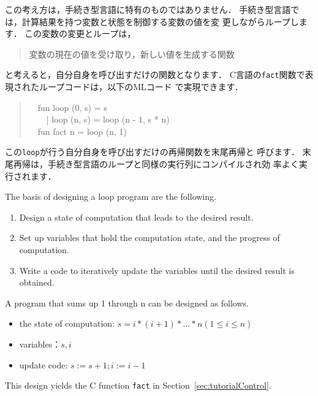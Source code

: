 \documentclass{jbook}
\newcommand{\myem}{\mbox{\ \ }}
\begin{document}
	この考え方は，手続き型言語に特有のものではありません．
	手続き型言語では，計算結果を持つ変数と状態を制御する変数の値を変
更しながらループします．
	この変数の変更とループは，
\begin{quote}
変数の現在の値を受け取り，新しい値を生成する関数
\end{quote}
と考えると，自分自身を呼び出すだけの関数となります．
	C言語の{\tt fact}関数で表現されたループコードは，以下のMLコード
で実現できます．
\begin{tt}
\begin{quote}
\myem  fun loop (0, s) = s\\
\myem \ \    | loop (n, s) = loop (n - 1, s * n)\\
\myem fun fact n = loop (n, 1)
\end{quote}
\end{tt}
	この{\tt loop}が行う自分自身を呼び出すだけの再帰関数を末尾再帰と
呼びます．
	末尾再帰は，手続き型言語のループと同様の実行列にコンパイルされ効
率よく実行されます．
\else%
	
	The basis of designing a loop program are the following.
\begin{enumerate}
\item 
	Design a state of computation that leads to the desired result.
\item 
	Set up variables that hold the computation state, and the
progress of computation.
\item 	
	Write a code to iteratively update the variables until 
the desired result is obtained.
\end{enumerate}
	A program that sums up 1 through n can be designed as follows.
\begin{itemize}
\item 
the state of computation:
$s = i * (i + 1) * ... * n (1\le i\le n)$
\item 
variables：$s, i$
\item 
update code: $s := s + 1; i := i - 1$
\end{itemize}
This design yields the C function {\tt fact} in Section~\ref{sec:tutorialControl}.
\end{document}
